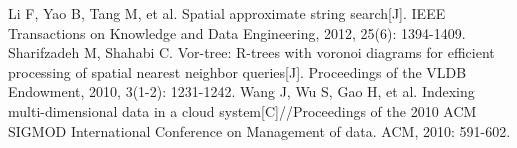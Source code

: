 \documentclass{ML}
\begin{document}
\begin{thebibliography}{20}
     Li F, Yao B, Tang M, et al. Spatial approximate string search[J]. IEEE Transactions on Knowledge and Data Engineering, 2012, 25(6): 1394-1409.
     Sharifzadeh M, Shahabi C. Vor-tree: R-trees with voronoi diagrams for efficient processing of spatial nearest neighbor queries[J]. Proceedings of the VLDB Endowment, 2010, 3(1-2): 1231-1242.
     Wang J, Wu S, Gao H, et al. Indexing multi-dimensional data in a cloud system[C]//Proceedings of the 2010 ACM SIGMOD International Conference on Management of data. ACM, 2010: 591-602.
\end{thebibliography}
\end{document}
